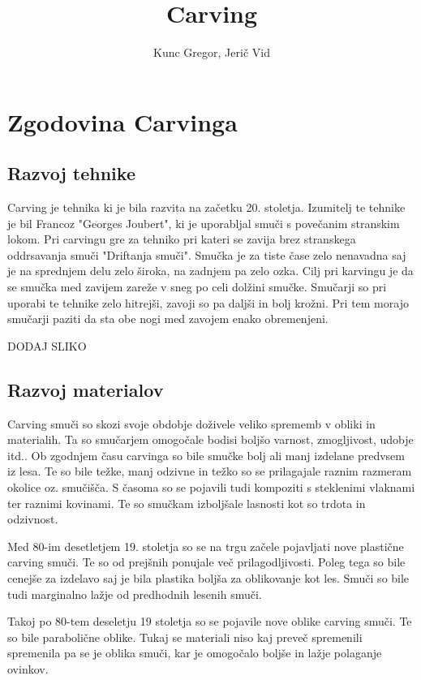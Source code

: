 \documentclass{article}
\title{Carving}
\author{Kunc Gregor, Jerič Vid}
\begin{document}
\maketitle

\section{Zgodovina Carvinga}

\subsection*{Razvoj tehnike}
Carving je tehnika ki je bila razvita na začetku 20. stoletja. Izumitelj te tehnike je bil Francoz "Georges Joubert", ki je uporabljal smuči s povečanim stranskim lokom.
Pri carvingu gre za tehniko pri kateri se zavija brez stranskega oddrsavanja smuči "Driftanja smuči".
Smučka je za tiste čase zelo nenavadna saj je na sprednjem delu zelo široka, na zadnjem pa zelo ozka.
Cilj pri karvingu je da se smučka med zavijem zareže v sneg po celi dolžini smučke. Smučarji so pri uporabi te tehnike zelo hitrejši, zavoji so pa daljši in bolj krožni. 
Pri tem morajo smučarji paziti da sta obe nogi med zavojem enako obremenjeni. 

DODAJ SLIKO

\subsection*{Razvoj materialov}
Carving smuči so skozi svoje obdobje doživele veliko sprememb v obliki in materialih.
Ta so smučarjem omogočale bodisi boljšo varnost, zmogljivost, udobje itd..
Ob zgodnjem času carvinga so bile smučke bolj ali manj izdelane predvsem iz lesa.
Te so bile težke, manj odzivne in težko so se prilagajale raznim razmeram okolice oz. smučišča.
S časoma so se pojavili tudi kompoziti s steklenimi vlaknami ter raznimi kovinami.
Te so smučkam izboljšale lasnosti kot so trdota in odzivnost.


Med 80-im desetletjem 19. stoletja so se na trgu začele pojavljati nove plastične carving smuči.
Te so od prejšnih ponujale več prilagodljivosti. Poleg tega so bile cenejše za izdelavo saj je bila plastika boljša za oblikovanje kot les.
Smuči so bile tudi marginalno lažje od predhodnih lesenih smuči.


Takoj po 80-tem deseletju 19 stoletja so se pojavile nove oblike carving smuči. Te so bile parabolične oblike. Tukaj se materiali niso kaj preveč spremenili
spremenila pa se je oblika smuči, kar je omogočalo boljše in lažje polaganje ovinkov.
\end{document}
